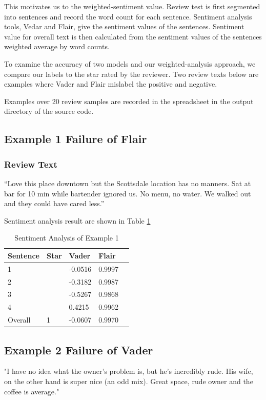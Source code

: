 \documentclass[sigconf]{acmart}
\begin{document}
This motivates us to the weighted-sentiment value. Review test is first segmented into sentences and record the word count for each sentence. Sentiment analysis tools, Vedar and Flair, give the sentiment values of the sentences. Sentiment value for overall text is then calculated from the sentiment values of the sentences weighted average by word counts.

To examine the accuracy of two models and our weighted-analysis approach, we compare our labels to the star rated by the reviewer. Two review texts below are examples where Vader and Flair mislabel the positive and negative.

Examples over 20 review samples are recorded in the spreadsheet in the output directory of the source code.

\subsection{Example 1 Failure of Flair}
\subsubsection{Review Text}“Love this place downtown but the Scottsdale location has no manners. Sat at bar for 10 min while bartender ignored us. No menu, no water. We walked out and they could have cared less.”

Sentiment analysis result are shown in Table \ref{tab:eg1}
\begin{table}
  \caption{Sentiment Analysis of Example 1}
  \label{tab:eg1}
  \begin{tabular}{lllll}
    \toprule
    Sentence & Star & Vader & Flair \\
    \midrule
    1 & & -0.0516 & 0.9997\\
    2 & & -0.3182 & 0.9987\\
    3 & & -0.5267 & 0.9868\\
    4 & & 0.4215 & 0.9962\\
    \bottomrule
    Overall & 1 & -0.0607 & 0.9970\\
\end{tabular}
\end{table}

\subsection{Example 2 Failure of Vader}

"I have no idea what the owner's problem is, but he's incredibly rude. His wife, on the other hand is super nice (an odd mix). Great space, rude owner and the coffee is average."
\end{document}
